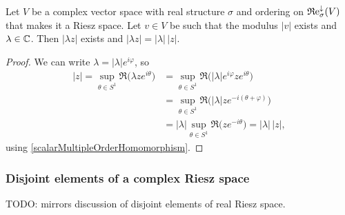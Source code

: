 \begin{lemma} \label{scalarOutOfModulus}
Let $V$ be a complex vector space with real structure $\sigma$ and ordering on $\operatorname{\mathfrak{R}e}^\downarrow_\sigma(V)$ that makes it a Riesz space. Let $v\in V$ be such that the modulus $|v|$ exists and $\lambda \in \mathbb{C}$. Then $|\lambda z|$ exists and $|\lambda z| = |\lambda|\,|z|$.
\end{lemma}
\begin{proof}
We can write $\lambda = |\lambda|e^{i\varphi}$, so
\begin{align*}
|z| = \sup_{\theta\in S^1} \Re\big(\lambda ze^{i\theta}\big) &= \sup_{\theta\in S^1} \Re\big(|\lambda|e^{i\varphi} ze^{i\theta}\big) \\
&= \sup_{\theta\in S^1} \Re\big(|\lambda|ze^{-i(\theta+\varphi)}\big) \\
&= |\lambda|\sup_{\theta\in S^1} \Re\big(ze^{-i\theta}\big) = |\lambda|\, |z|,
\end{align*}
using \ref{scalarMultipleOrderHomomorphism}.
\end{proof}

\subsubsection{Disjoint elements of a complex Riesz space}
TODO: mirrors discussion of disjoint elements of real Riesz space.

